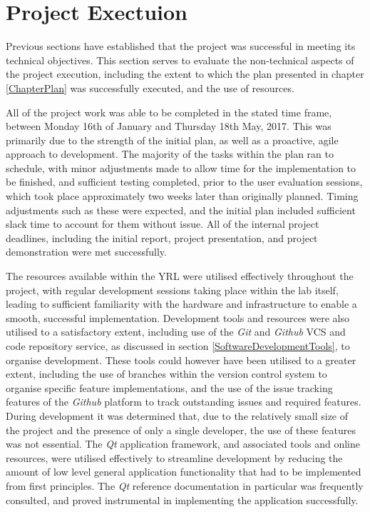 
\section{Project Exectuion}

Previous sections have established that the project was successful in meeting its technical objectives. This section serves to evaluate the non-technical aspects of the project execution, including the extent to which the plan presented in chapter \ref{ChapterPlan} was successfully executed, and the use of resources.

All of the project work was able to be completed in the stated time frame, between Monday 16th of January and Thursday 18th May, 2017. This was primarily due to the strength of the initial plan, as well as a proactive, agile approach to development. The majority of the tasks within the plan ran to schedule, with minor adjustments made to allow time for the implementation to be finished, and sufficient testing completed, prior to the user evaluation sessions, which took place approximately two weeks later than originally planned. Timing adjustments such as these were expected, and the initial plan included sufficient slack time to account for them without issue. All of the internal project deadlines, including the initial report, project presentation, and project demonstration were met successfully.

The resources available within the YRL were utilised effectively throughout the project, with regular development sessions taking place within the lab itself, leading to sufficient familiarity with the hardware and infrastructure to enable a smooth, successful implementation. Development tools and resources were also utilised to a satisfactory extent, including use of the \textit{Git} and \textit{Github} VCS and code repository service, as discussed in section \ref{SoftwareDevelopmentTools}, to organise development. These tools could however have been utilised to a greater extent, including the use of branches within the version control system to organise specific feature implementations, and the use of the issue tracking features of the \textit{Github} platform to track outstanding issues and required features. During development it was determined that, due to the relatively small size of the project and the presence of only a single developer, the use of these features was not essential. The \textit{Qt} application framework, and associated tools and online resources, were utilised effectively to streamline development by reducing the amount of low level general application functionality that had to be implemented from first principles. The \textit{Qt} reference documentation \cite{QtDocs} in particular was frequently consulted, and proved instrumental in implementing the application successfully.

